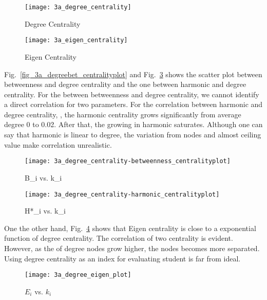 \documentclass[runningheads]{llncs}
\begin{document}
\begin{figure}
\centering
\texttt{[image: 3a\_degree\_centrality]}
\caption{Degree Centrality} \label{fig_3a_degree_centrality}
\end{figure}


\begin{figure}
\centering
\texttt{[image: 3a\_eigen\_centrality]}
\caption{Eigen Centrality} \label{fig_3a_eigen_centrality}
\end{figure}

Fig.~\ref{fig_3a_degreebet_centralityplot} and Fig.~\ref{fig_3a_degree_harmonic_centralityplot} shows the scatter plot between betweenness and degree centrality and the one between harmonic and degree centrality. For the between betweenness and degree centrality, we cannot identify a direct correlation for two parameters. For the correlation between harmonic and degree centrality, , the harmonic centrality grows significantly from average degree 0 to 0.02. After that, the growing in harmonic saturates. Although one can say that harmonic is linear to degree, the variation from nodes and almost ceiling value make correlation unrealistic.


\begin{figure}
    \centering
    \begin{minipage}{0.5\textwidth}
        \centering
        \texttt{[image: 3a\_degree\_centrality-betweenness\_centralityplot]} %
        \caption{B_{i} vs. k_{i}}
        \label{fig_3a_degreebet_centralityplot}
    \end{minipage}\hfill
    \begin{minipage}{0.5\textwidth}
        \centering
        \texttt{[image: 3a\_degree\_centrality-harmonic\_centralityplot]} %
        \caption{H*_{i}  vs.  k_{i}}
        \label{fig_3a_degree_harmonic_centralityplot}
    \end{minipage}
\end{figure}

One the other hand, Fig.~\ref{fig_3a_plot_eigen}  shows that Eigen centrality is close to a exponential function of degree centrality. The correlation of two centrality is evident. However, as the of degree nodes grow higher, the nodes becomes more separated. Using degree centrality as an index for evaluating student is far from ideal. 

\begin{figure}
\centering
\texttt{[image: 3a\_degree\_eigen\_plot]}
\caption{ \(E_{i}\) vs. \(k_{i}\)} 
\label {fig_3a_plot_eigen}
\end{figure}
\end{document}
